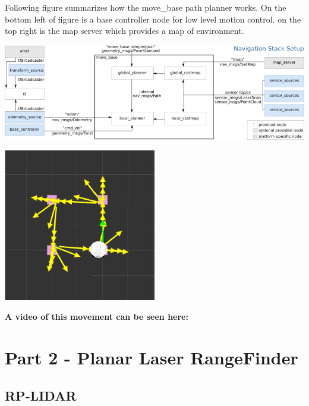 \documentclass[10pt,a4paper]{article}
\begin{document}
Following figure summarizes how the move\_base path planner works. On the bottom left of figure is a base controller node for low level motion control. on the top right is the map server which provides a map of environment.

\begin{center}
\includegraphics[width=\textwidth]{images/overview_small.png}
\end{center}

\begin{center}
\includegraphics[width=0.5\textwidth]{images/move_base.jpg}\\
\end{center}

\textbf{A video of this movement can be seen here:}\\

\section{Part 2 - Planar Laser RangeFinder}

\subsection{RP-LIDAR}
\end{document}
